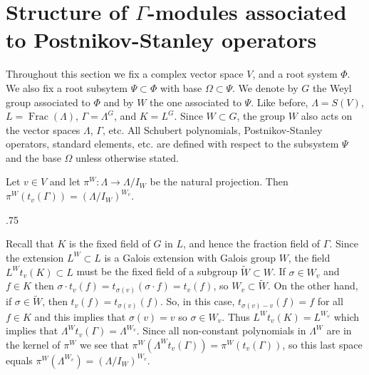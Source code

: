 \documentclass[11pt,fleqn]{amsart}
\makeatletter
\renewcommand\proofname{Proof}
\renewenvironment{proof}[1][\textit{\proofname}]{\par
 \pushQED{\qed}%
 \normalfont \topsep.75\paraskip\relax
 \trivlist
 \item[\hskip\labelsep
 \itshape
 #1\@addpunct{.}]\ignorespaces
}{%
 \popQED\endtrivlist\@endpefalse
}
\newcounter{para}[section]
\renewcommand\to{\longrightarrow}
\DeclareMathOperator\Frac{Frac}
\makeatother
\begin{document}
\section{Structure of $\Gamma$-modules associated to Postnikov-Stanley 
operators}
Throughout this section we fix a complex vector space $V$, and a root system
$\Phi$. We also fix a root subsytem $\Psi \subset \Phi$ with base
$\Omega \subset \Psi$. We denote by $G$ the Weyl group associated to 
$\Phi$ and by $W$ the one associated to $\Psi$. Like before, 
$\Lambda = S(V)$, $L = 
\Frac(\Lambda)$, 
$\Gamma = \Lambda^G$, and $K = L^G$. Since $W \subset G$, the group $W$ also 
acts on the vector spaces $\Lambda$, $\Gamma$, etc. All Schubert polynomials, 
Postnikov-Stanley operators, standard elements, etc. are defined with respect 
to the subsystem $\Psi$ and the base $\Omega$ unless otherwise stated.

\begin{Lemma}
\label{L:translation}
Let $v \in V$ and let $\pi^W: \Lambda \to \Lambda/I_W$ be the natural 
projection. Then $\pi^W(t_v(\Gamma)) = (\Lambda/I_W)^{W_v}$.
\end{Lemma}
\begin{proof}
Recall that $K$ is the fixed field of $G$ in $L$, and hence the fraction field of 
$\Gamma$. Since the extension $L^W \subset L$ is a Galois extension with 
Galois group $W$, the field $L^W t_v(K) \subset L$ must be the fixed field
of a subgroup $\widetilde W \subset W$. If $\sigma \in W_v$ and $f \in K$ then
$\sigma \cdot t_v(f) = t_{\sigma(v)} (\sigma \cdot f) = t_v(f)$, so $W_v 
\subset \widetilde W$. On the other hand, if $\sigma \in \widetilde W$, then $t_v(f)
= t_{\sigma(v)}(f)$.  So, in this case, $t_{\sigma(v) - v}(f) = f$ for all $f \in K$ and this
implies that $\sigma(v) = v$ so $\sigma \in W_v$. Thus $L^W t_v(K) = L^{W_v}$
which implies that $\Lambda^{W} t_v(\Gamma) = \Lambda^{W_v}$. Since all non-constant polynomials in $\Lambda^W$ are in the kernel of $\pi^W$ we see that
$\pi^W(\Lambda^W t_v(\Gamma)) = \pi^W(t_v(\Gamma))$, so this last space equals
$\pi^W(\Lambda^{W_v}) = (\Lambda/I_W)^{W_v}$.
\end{proof}
\end{document}
